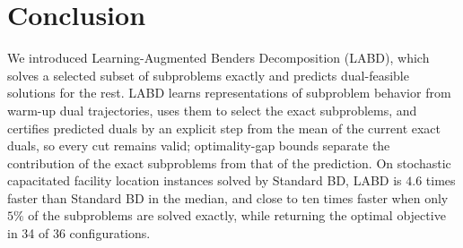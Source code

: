 \section{Conclusion}\label{sec:conclusion}

We introduced Learning-Augmented Benders Decomposition (LABD), which solves a selected subset of subproblems exactly and predicts dual-feasible solutions for the rest. LABD learns representations of subproblem behavior from warm-up dual trajectories, uses them to select the exact subproblems, and certifies predicted duals by an explicit step from the mean of the current exact duals, so every cut remains valid; optimality-gap bounds separate the contribution of the exact subproblems from that of the prediction. On stochastic capacitated facility location instances solved by Standard BD, LABD is $4.6$ times faster than Standard BD in the median, and close to ten times faster when only $5\%$ of the subproblems are solved exactly, while returning the optimal objective in 34 of 36 configurations.
